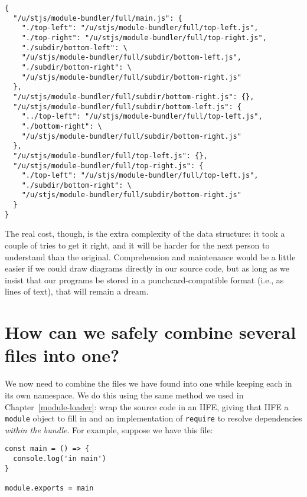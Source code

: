 \documentclass[krantzl]{krantz}
\newcommand{\chapref}[1]{Chapter~\ref{#1}}
\begin{document}
\begin{lstlisting}[frame=single,frameround=tttt]
{
  "/u/stjs/module-bundler/full/main.js": {
    "./top-left": "/u/stjs/module-bundler/full/top-left.js",
    "./top-right": "/u/stjs/module-bundler/full/top-right.js",
    "./subdir/bottom-left": \
    "/u/stjs/module-bundler/full/subdir/bottom-left.js",
    "./subdir/bottom-right": \
    "/u/stjs/module-bundler/full/subdir/bottom-right.js"
  },
  "/u/stjs/module-bundler/full/subdir/bottom-right.js": {},
  "/u/stjs/module-bundler/full/subdir/bottom-left.js": {
    "../top-left": "/u/stjs/module-bundler/full/top-left.js",
    "./bottom-right": \
    "/u/stjs/module-bundler/full/subdir/bottom-right.js"
  },
  "/u/stjs/module-bundler/full/top-left.js": {},
  "/u/stjs/module-bundler/full/top-right.js": {
    "./top-left": "/u/stjs/module-bundler/full/top-left.js",
    "./subdir/bottom-right": \
    "/u/stjs/module-bundler/full/subdir/bottom-right.js"
  }
}
\end{lstlisting}



\noindent The real cost, though, is the extra complexity of the data structure:
it took a couple of tries to get it right,
and it will be harder for the next person to understand than the original.
Comprehension and maintenance would be a little easier
if we could draw diagrams directly in our source code,
but as long as we insist that our programs be stored in a punchcard-compatible format
(i.e., as lines of text),
that will remain a dream.

\section{How can we safely combine several files into one?}\label{module-bundler-combine}


We now need to combine the files we have found into one
while keeping each in its own namespace.
We do this using the same method we used in \chapref{module-loader}:
wrap the source code in an IIFE,
giving that IIFE a \texttt{module} object to fill in
and an implementation of \texttt{require} to resolve dependencies \emph{within the bundle}.
For example, suppose we have this file:


\begin{lstlisting}[frame=single,frameround=tttt]
const main = () => {
  console.log('in main')
}

module.exports = main
\end{lstlisting}
\end{document}
